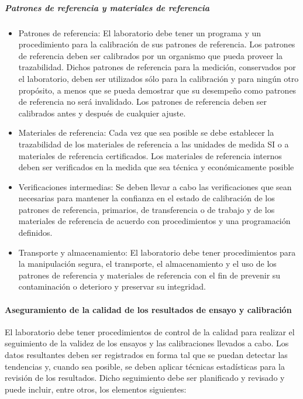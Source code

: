 			\subparagraph{Patrones de referencia y materiales de referencia}
				\begin{itemize}
					\item Patrones de referencia: El laboratorio debe tener un programa y un procedimiento para la calibración de sus patrones de referencia.
					Los patrones de referencia deben ser calibrados por un organismo que pueda proveer la trazabilidad. Dichos patrones de referencia para la medición, conservados por el laboratorio, deben ser
					utilizados sólo para la calibración y para ningún otro propósito, a menos que se pueda demostrar que su
					desempeño como patrones de referencia no será invalidado. Los patrones de referencia deben ser calibrados
					antes y después de cualquier ajuste.
					
					\item Materiales de referencia: Cada vez que sea posible se debe establecer la trazabilidad de los materiales de referencia a las unidades de
					medida SI o a materiales de referencia certificados. Los materiales de referencia internos deben ser
					verificados en la medida que sea técnica y económicamente posible
					
\newpage
\thispagestyle{plain}
					
					\item Verificaciones intermedias: Se deben llevar a cabo las verificaciones que sean necesarias para mantener la confianza en el estado de
					calibración de los patrones de referencia, primarios, de transferencia o de trabajo y de los materiales de
					referencia de acuerdo con procedimientos y una programación definidos.
					
					\item Transporte y almacenamiento: El laboratorio debe tener procedimientos para la manipulación segura, el transporte, el almacenamiento y el
					uso de los patrones de referencia y materiales de referencia con el fin de prevenir su contaminación o
					deterioro y preservar su integridad.
				\end{itemize}
			
		\paragraph{Aseguramiento de la calidad de los resultados de ensayo y calibración}
			\par 
				El laboratorio debe tener procedimientos de control de la calidad para realizar el seguimiento de la
				validez de los ensayos y las calibraciones llevados a cabo. Los datos resultantes deben ser registrados en
				forma tal que se puedan detectar las tendencias y, cuando sea posible, se deben aplicar técnicas estadísticas
				para la revisión de los resultados. Dicho seguimiento debe ser planificado y revisado y puede incluir, entre
				otros, los elementos siguientes:
				
